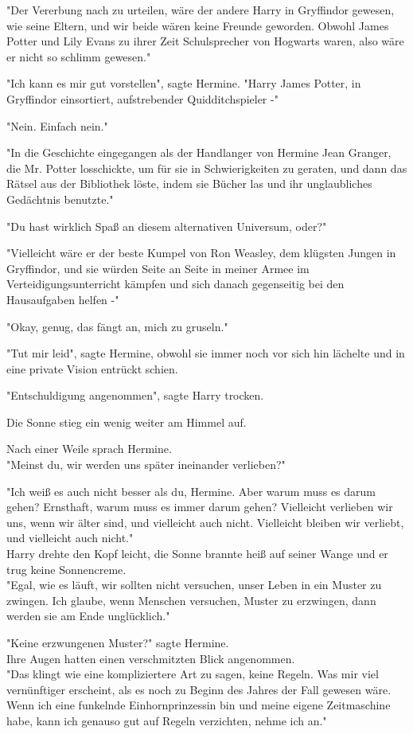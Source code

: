 {"Der Vererbung nach zu urteilen, wäre der andere Harry in Gryffindor gewesen, wie seine Eltern, und wir beide wären keine Freunde geworden. Obwohl James Potter und Lily Evans zu ihrer Zeit Schulsprecher von Hogwarts waren, also wäre er nicht so schlimm gewesen."

"Ich kann es mir gut vorstellen", sagte Hermine. "Harry James Potter, in Gryffindor einsortiert, aufstrebender Quidditchspieler -"

"Nein. Einfach nein."

"In die Geschichte eingegangen als der Handlanger von Hermine Jean Granger, die Mr. Potter losschickte, um für sie in Schwierigkeiten zu geraten, und dann das Rätsel aus der Bibliothek löste, indem sie Bücher las und ihr unglaubliches Gedächtnis benutzte."

"Du hast wirklich Spaß an diesem alternativen Universum, oder?"

"Vielleicht wäre er der beste Kumpel von Ron Weasley, dem klügsten Jungen in Gryffindor, und sie würden Seite an Seite in meiner Armee im Verteidigungsunterricht kämpfen und sich danach gegenseitig bei den Hausaufgaben helfen -"

"Okay, genug, das fängt an, mich zu gruseln."

"Tut mir leid", sagte Hermine, obwohl sie immer noch vor sich hin lächelte und in eine private Vision entrückt schien.

"Entschuldigung angenommen", sagte Harry trocken.

Die Sonne stieg ein wenig weiter am Himmel auf.

Nach einer Weile sprach Hermine.\\ "Meinst du, wir werden uns später ineinander verlieben?"

"Ich weiß es auch nicht besser als du, Hermine. Aber warum muss es darum gehen? Ernsthaft, warum muss es immer darum gehen? Vielleicht verlieben wir uns, wenn wir älter sind, und vielleicht auch nicht. Vielleicht bleiben wir verliebt, und vielleicht auch nicht."\\ Harry drehte den Kopf leicht, die Sonne brannte heiß auf seiner Wange und er trug keine Sonnencreme.\\ "Egal, wie es läuft, wir sollten nicht versuchen, unser Leben in ein Muster zu zwingen. Ich glaube, wenn Menschen versuchen, Muster zu erzwingen, dann werden sie am Ende unglücklich."

"Keine erzwungenen Muster?" sagte Hermine.\\ Ihre Augen hatten einen verschmitzten Blick angenommen.\\ "Das klingt wie eine kompliziertere Art zu sagen, keine Regeln. Was mir viel vernünftiger erscheint, als es noch zu Beginn des Jahres der Fall gewesen wäre. Wenn ich eine funkelnde Einhornprinzessin bin und meine eigene Zeitmaschine habe, kann ich genauso gut auf Regeln verzichten, nehme ich an."

}
